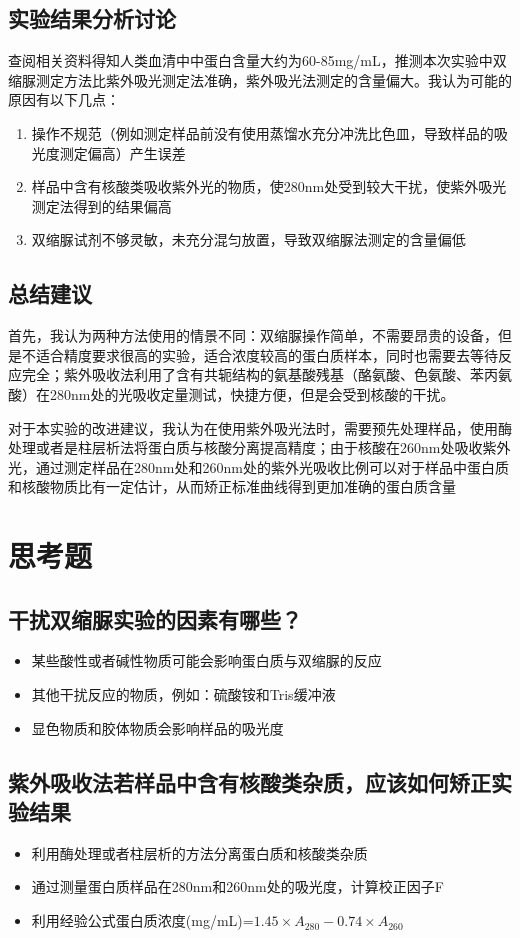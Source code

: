 \documentclass[UTF8]{ctexart}
\begin{document}
\subsection{实验结果分析讨论}

查阅相关资料得知人类血清中中蛋白含量大约为60-85mg/mL，推测本次实验中双缩脲测定方法比紫外吸光测定法准确，紫外吸光法测定的含量偏大。我认为可能的原因有以下几点：
\begin{enumerate}
    \item 操作不规范（例如测定样品前没有使用蒸馏水充分冲洗比色皿，导致样品的吸光度测定偏高）产生误差
    \item 样品中含有核酸类吸收紫外光的物质，使280nm处受到较大干扰，使紫外吸光测定法得到的结果偏高
    \item 双缩脲试剂不够灵敏，未充分混匀放置，导致双缩脲法测定的含量偏低
\end{enumerate}

\subsection{总结建议}
首先，我认为两种方法使用的情景不同：双缩脲操作简单，不需要昂贵的设备，但是不适合精度要求很高的实验，适合浓度较高的蛋白质样本，同时也需要去等待反应完全；紫外吸收法利用了含有共轭结构的氨基酸残基（酪氨酸、色氨酸、苯丙氨酸）在280nm处的光吸收定量测试，快捷方便，但是会受到核酸的干扰。

对于本实验的改进建议，我认为在使用紫外吸光法时，需要预先处理样品，使用酶处理或者是柱层析法将蛋白质与核酸分离提高精度；由于核酸在260nm处吸收紫外光，通过测定样品在280nm处和260nm处的紫外光吸收比例可以对于样品中蛋白质和核酸物质比有一定估计，从而矫正标准曲线得到更加准确的蛋白质含量

\section{思考题}
\subsection{干扰双缩脲实验的因素有哪些？}
\begin{itemize}
	\item 某些酸性或者碱性物质可能会影响蛋白质与双缩脲的反应
	\item 其他干扰反应的物质，例如：硫酸铵和Tris缓冲液
	\item 显色物质和胶体物质会影响样品的吸光度
\end{itemize}

\subsection{紫外吸收法若样品中含有核酸类杂质，应该如何矫正实验结果}
\begin{itemize}
	\item 利用酶处理或者柱层析的方法分离蛋白质和核酸类杂质
	\item 通过测量蛋白质样品在280nm和260nm处的吸光度，计算校正因子F
	\item 利用经验公式蛋白质浓度(mg/mL)=$1.45 \times A_{280}-0.74 \times A_{260}$
\end{itemize}
\end{document}
